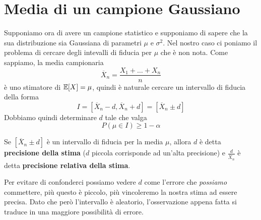 \section{Media di un campione Gaussiano}
Supponiamo ora di avere un campione statistico e supponiamo di sapere che la sua distribuzione sia
Gaussiana di parametri $\mu$ e $\sigma^2$. Nel nostro caso ci poniamo il problema di cercare degli
intevalli di fiducia per $\mu$ che è non nota. Come sappiamo, la media campionaria
\[ \overline{X}_n = \frac{X_1 + \dots + X_n}{n} \]
è uno stimatore di $\mathbb{E}[X] = \mu$, quindi è naturale cercare un intervallo di fiducia della forma
\[ I = [\overline{X}_n - d, \overline{X}_n + d] = [\overline{X}_n \pm d] \]
Dobbiamo quindi determinare $d$ tale che valga
\[ P(\mu \in I) \geq 1 - \alpha \]

\begin{definition}
	Se $[\overline{X}_n \pm d]$ è un intervallo di fiducia per la media $\mu$, allora $d$ è detta
	\textbf{precisione della stima} ($d$ piccola corrisponde ad un'alta precisione) e
	$\frac{d}{\overline{X}_n}$ è detta \textbf{precisione relativa della stima}.
\end{definition}

Per evitare di confonderci possiamo vedere $d$ come l'errore che \emph{possiamo} commettere, più
questo è piccolo, più vincoleremo la nostra stima ad essere precisa. Dato che però l'intervallo è
aleatorio, l'osservazione appena fatta si traduce in una maggiore possibilità di errore.

